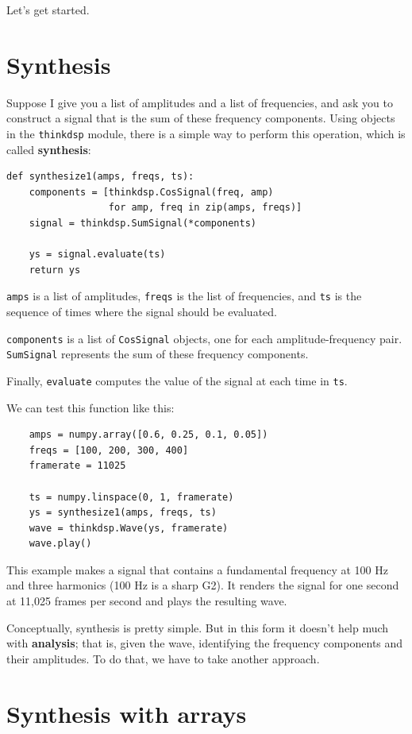 \documentclass[12pt]{book}
\begin{document}
Let's get started.


\section{Synthesis}

Suppose I give you a list of amplitudes and a list of frequencies,
and ask you to construct a signal that is the sum of these frequency
components.  Using objects in the {\tt thinkdsp} module, there is
a simple way to perform this operation, which is called {\bf synthesis}:

\begin{verbatim}
def synthesize1(amps, freqs, ts):
    components = [thinkdsp.CosSignal(freq, amp)
                  for amp, freq in zip(amps, freqs)]
    signal = thinkdsp.SumSignal(*components)

    ys = signal.evaluate(ts)
    return ys
\end{verbatim}

{\tt amps} is a list of amplitudes, {\tt freqs} is the list
of frequencies, and {\tt ts} is the sequence
of times where the signal should be evaluated.

{\tt components} is a list of {\tt CosSignal} objects, one for
each amplitude-frequency pair.  {\tt SumSignal} represents the
sum of these frequency components.

Finally, {\tt evaluate} computes the value of the signal at each
time in {\tt ts}.

We can test this function like this:

\begin{verbatim}
    amps = numpy.array([0.6, 0.25, 0.1, 0.05])
    freqs = [100, 200, 300, 400]
    framerate = 11025

    ts = numpy.linspace(0, 1, framerate)
    ys = synthesize1(amps, freqs, ts)
    wave = thinkdsp.Wave(ys, framerate)
    wave.play()
\end{verbatim}

This example makes a signal that contains a fundamental frequency at
100 Hz and three harmonics (100 Hz is a sharp G2).  It renders the
signal for one second at 11,025 frames per second and plays the
resulting wave.

Conceptually, synthesis is pretty simple.  But in this form it doesn't
help much with {\bf analysis}; that is, given the wave, identifying
the frequency components and their amplitudes.  To do that, we have
to take another approach.


\section{Synthesis with arrays}
\end{document}
